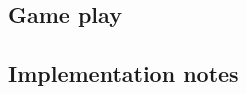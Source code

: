 \subsection{Game play}
\label{subsec:game-play-current}


\subsection{Implementation notes}
\label{subsec:current:impl}
